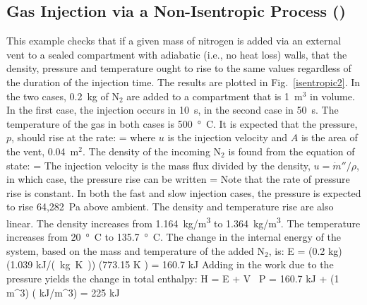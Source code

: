 \documentclass[11pt]{book}
\begin{document}
\subsection{Gas Injection via a Non-Isentropic Process (\texorpdfstring{}{isentropic2})}

This example checks that if a given mass of nitrogen is added via an external vent to a sealed compartment with adiabatic (i.e., no heat loss) walls, that the density, pressure and temperature ought to rise to the same values regardless of the duration of the injection time.  The results are plotted in Fig.~\ref{isentropic2}. In the two cases, 0.2~kg of N$_2$ are added to a compartment that is 1~m$^3$ in volume. In the first case, the injection occurs in 10~s, in the second case in 50~s. The temperature of the gas in both cases is 500~\si{\degree C}. It is expected that the pressure, $p$, should rise at the rate:
\be
    = 
\ee
where $u$ is the injection velocity and $A$ is the area of the vent, 0.04~m$^2$. The density of the incoming N$_2$ is found from the equation of state:
\be
   \rho = 
\ee
The injection velocity is the mass flux divided by the density, $u=\dot{m}''/\rho$, in which case, the pressure rise can be written
\be
    = 
\ee
Note that the rate of pressure rise is constant. In both the fast and slow injection cases, the pressure is expected to rise 64,282~Pa above ambient. The density and temperature rise are also linear. The density increases from 1.164~\si{kg/m^3} to 1.364~\si{kg/m^3}. The temperature increases from 20~\si{\degree C} to 135.7~\si{\degree C}. The change in the internal energy of the system, based on the mass and temperature of the added N$_2$, is:
\be
   \Delta E = (0.2 \; \hbox{kg}) \times (1.039 \; \hbox{\si{kJ/(kg.K)}}) \times (773.15 \; \hbox{K} ) = 160.7 \; \hbox{kJ}
\ee
Adding in the work due to the pressure yields the change in total enthalpy:
\be
   \Delta H = \Delta E + V \, \Delta P = 160.7 \; \hbox{kJ} + (1 \; \hbox{m}^3) \times (  \; \hbox{kJ/m}^3) = 225 \; \hbox{kJ}
\ee
\end{document}
